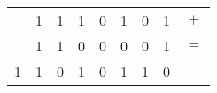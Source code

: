 \documentclass{standalone}
\begin{document}
\begin{tabular}{ cccccccc|c }
	& 1 & 1 & 1 & 0 & 1 & 0 & 1 & \(+\)\\
	& 1 & 1 & 0 & 0 & 0 & 0 & 1 & \(=\)\\\hline
	1 & 1 & 0 & 1 & 0 & 1 & 1 & 0 &
\end{tabular}
\end{document}
